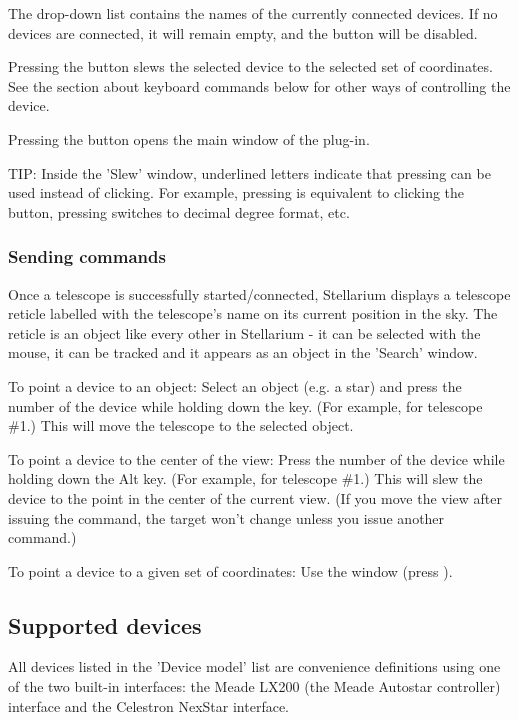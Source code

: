 The drop-down list contains the names of the currently connected
devices. If no devices are connected, it will remain empty, and the
 button will be disabled.

Pressing the  button slews the selected device to the selected set
of coordinates. See the section about keyboard commands below for
other ways of controlling the device.

Pressing the  button opens the main window of
the plug-in.

TIP: Inside the 'Slew' window, underlined letters indicate that
pressing  can be used instead of
clicking. For example, pressing  is equivalent to
clicking the  button, pressing  switches to
decimal degree format, etc.


\subsubsection{Sending commands}

Once a telescope is successfully started/connected, Stellarium
displays a telescope reticle labelled with the telescope's name on its
current position in the sky. The reticle is an object like every other
in Stellarium - it can be selected with the mouse, it can be tracked
and it appears as an object in the 'Search' window.

To point a device to an object: Select an object (e.g. a star) and
press the number of the device while holding down the \keys{\ctrl} key. (For
example,  for telescope \#1.) This will move the telescope to the
selected object.

To point a device to the center of the view: Press the number of the
device while holding down the Alt key. (For example,  for
telescope \#1.) This will slew the device to the point in the center of
the current view. (If you move the view after issuing the command, the
target won't change unless you issue another command.)

To point a device to a given set of coordinates: Use the  window (press ).

\subsection{Supported devices}
\label{sec:plugins:TelescopeControl:supported}

All devices listed in the 'Device model' list are convenience
definitions using one of the two built-in interfaces: the Meade LX200
(the Meade Autostar controller) interface and the Celestron NexStar
interface.

